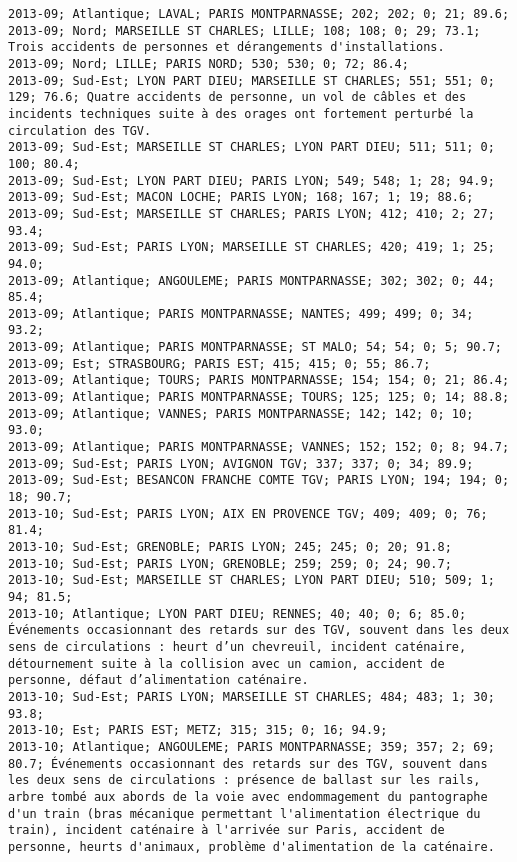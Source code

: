 \documentclass{article}
\begin{document}
\begin{Verbatim}[commandchars=\\\{\}]
2013-09; Atlantique; LAVAL; PARIS MONTPARNASSE; 202; 202; 0; 21; 89.6; 
2013-09; Nord; MARSEILLE ST CHARLES; LILLE; 108; 108; 0; 29; 73.1; Trois accidents de personnes et dérangements d'installations.
2013-09; Nord; LILLE; PARIS NORD; 530; 530; 0; 72; 86.4; 
2013-09; Sud-Est; LYON PART DIEU; MARSEILLE ST CHARLES; 551; 551; 0; 129; 76.6; Quatre accidents de personne, un vol de câbles et des incidents techniques suite à des orages ont fortement perturbé la circulation des TGV.
2013-09; Sud-Est; MARSEILLE ST CHARLES; LYON PART DIEU; 511; 511; 0; 100; 80.4; 
2013-09; Sud-Est; LYON PART DIEU; PARIS LYON; 549; 548; 1; 28; 94.9; 
2013-09; Sud-Est; MACON LOCHE; PARIS LYON; 168; 167; 1; 19; 88.6; 
2013-09; Sud-Est; MARSEILLE ST CHARLES; PARIS LYON; 412; 410; 2; 27; 93.4; 
2013-09; Sud-Est; PARIS LYON; MARSEILLE ST CHARLES; 420; 419; 1; 25; 94.0; 
2013-09; Atlantique; ANGOULEME; PARIS MONTPARNASSE; 302; 302; 0; 44; 85.4; 
2013-09; Atlantique; PARIS MONTPARNASSE; NANTES; 499; 499; 0; 34; 93.2; 
2013-09; Atlantique; PARIS MONTPARNASSE; ST MALO; 54; 54; 0; 5; 90.7; 
2013-09; Est; STRASBOURG; PARIS EST; 415; 415; 0; 55; 86.7; 
2013-09; Atlantique; TOURS; PARIS MONTPARNASSE; 154; 154; 0; 21; 86.4; 
2013-09; Atlantique; PARIS MONTPARNASSE; TOURS; 125; 125; 0; 14; 88.8; 
2013-09; Atlantique; VANNES; PARIS MONTPARNASSE; 142; 142; 0; 10; 93.0; 
2013-09; Atlantique; PARIS MONTPARNASSE; VANNES; 152; 152; 0; 8; 94.7; 
2013-09; Sud-Est; PARIS LYON; AVIGNON TGV; 337; 337; 0; 34; 89.9; 
2013-09; Sud-Est; BESANCON FRANCHE COMTE TGV; PARIS LYON; 194; 194; 0; 18; 90.7; 
2013-10; Sud-Est; PARIS LYON; AIX EN PROVENCE TGV; 409; 409; 0; 76; 81.4; 
2013-10; Sud-Est; GRENOBLE; PARIS LYON; 245; 245; 0; 20; 91.8; 
2013-10; Sud-Est; PARIS LYON; GRENOBLE; 259; 259; 0; 24; 90.7; 
2013-10; Sud-Est; MARSEILLE ST CHARLES; LYON PART DIEU; 510; 509; 1; 94; 81.5; 
2013-10; Atlantique; LYON PART DIEU; RENNES; 40; 40; 0; 6; 85.0; Événements occasionnant des retards sur des TGV, souvent dans les deux sens de circulations : heurt d’un chevreuil, incident caténaire, détournement suite à la collision avec un camion, accident de personne, défaut d’alimentation caténaire.
2013-10; Sud-Est; PARIS LYON; MARSEILLE ST CHARLES; 484; 483; 1; 30; 93.8; 
2013-10; Est; PARIS EST; METZ; 315; 315; 0; 16; 94.9; 
2013-10; Atlantique; ANGOULEME; PARIS MONTPARNASSE; 359; 357; 2; 69; 80.7; Événements occasionnant des retards sur des TGV, souvent dans les deux sens de circulations : présence de ballast sur les rails, arbre tombé aux abords de la voie avec endommagement du pantographe d'un train (bras mécanique permettant l'alimentation électrique du train), incident caténaire à l'arrivée sur Paris, accident de personne, heurts d'animaux, problème d'alimentation de la caténaire.

\end{Verbatim}
\end{document}
